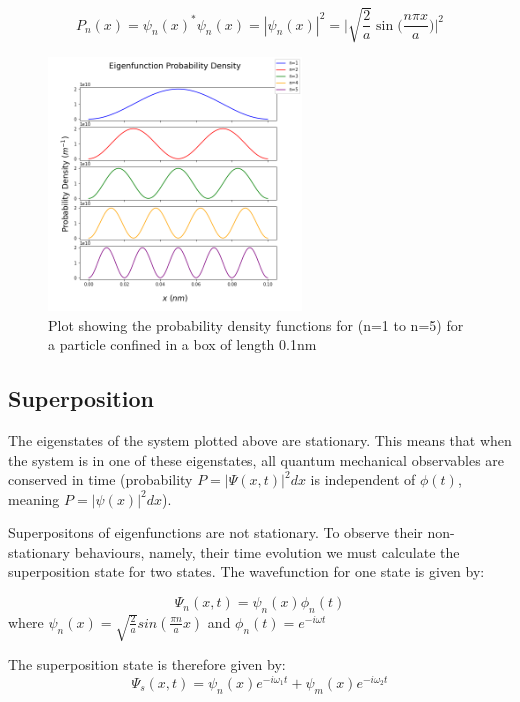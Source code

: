 $$P_n(x) =\psi_n (x)^{*}\psi_n (x) =|\psi_n(x)|^{2} = \Bigg|\sqrt{\frac{2}{a}}\sin\Big(\frac{n\pi x}{a}\Big)\Bigg|^{2}  $$

\begin{figure}[h]
    \centering
    \includegraphics[width=0.6\textwidth]{lab1/images/probabilityDensity.png} %
    \caption{Plot showing the probability density functions for (n=1 to n=5) for a particle confined in a box of length 0.1nm}
    \label{fig:probDens}
\end{figure}

\subsection{Superposition}

The eigenstates of the system plotted above are stationary. This means that when the system is in one of these eigenstates, all quantum mechanical observables are conserved in time (probability $P=|\Psi(x,t)|^2dx$ is independent of $\phi(t)$, meaning $P=|\psi(x)|^2dx$).

Superpositons of eigenfunctions are not stationary. To observe their non-stationary behaviours, namely, their time evolution we must calculate the superposition state for two states. The wavefunction for one state is given by:

$$\Psi_n (x,t) = \psi_n (x)\phi_n (t)$$
where $\psi_n (x)= \sqrt{\frac{2}{a}} sin(\frac{\pi n}{a}x)$ and $\phi_n (t)= e^{-i \omega t}$

The superposition state is therefore given by:
\begin{equation} \label{eq:superPos}
\Psi_s (x,t) = \psi_n (x)e^{-i \omega_{1} t} + \psi_m (x)e^{-i \omega_{2} t}
\end{equation}

